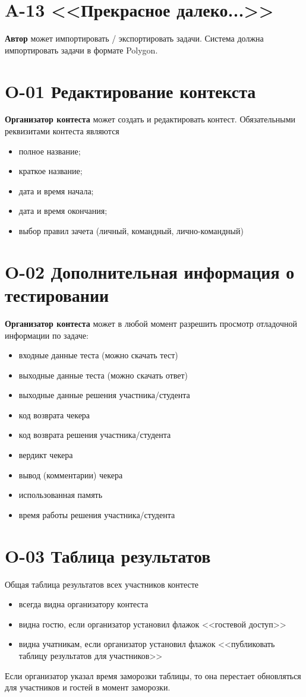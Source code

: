 \documentclass{book}
\newcommand{\newcard}[1]{\newpage \section*{#1}}
\begin{document}
\newcard{A-13 <<Прекрасное далеко...>>}
\textbf{Автор} может импортировать / экспортировать задачи. Система должна импортировать задачи в формате Polygon.



\newcard{O-01 Редактирование контекста}
\textbf{Организатор контеста} может создать и редактировать контест.
Обязательными реквизитами контеста являются
\begin{itemize}\setlength{\itemsep}{0pt}
	\item полное название;
	\item краткое название;
	\item дата и время начала;
	\item дата и время окончания;
	\item выбор правил зачета (личный, командный, лично-командный)
\end{itemize}


\newcard{O-02 Дополнительная информация о тестировании}
\textbf{Организатор контеста} может в любой момент разрешить просмотр отладочной информации по задаче:
\begin{itemize}\setlength{\itemsep}{0pt}
	\item входные данные теста (можно скачать тест)
	\item выходные данные теста (можно скачать ответ)
	\item выходные данные решения участника/студента
	\item код возврата чекера
	\item код возврата решения участника/студента
	\item вердикт чекера
	\item вывод (комментарии) чекера
	\item использованная память
	\item время работы решения участника/студента
\end{itemize}


\newcard{O-03 Таблица результатов}
	Общая таблица результатов всех участников контесте 
\begin{itemize}\setlength{\itemsep}{0pt}
	\item всегда видна организатору контеста
	\item видна гостю, если организатор установил флажок <<гостевой доступ>>
	\item видна учатникам, если организатор установил флажок <<публиковать таблицу результатов для участников>>
\end{itemize}
	Если организатор указал время заморозки таблицы, то она перестает обновляться для участников и гостей в момент заморозки.
\end{document}
